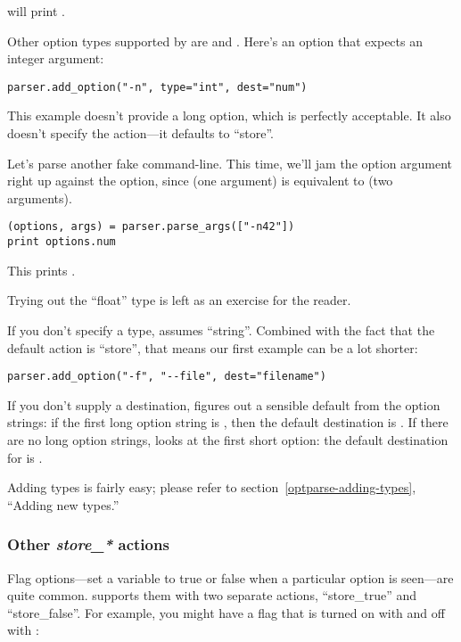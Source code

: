 will print .

Other option types supported by  are  and
.  Here's an option that expects an integer argument:

\begin{verbatim}
parser.add_option("-n", type="int", dest="num")
\end{verbatim}

This example doesn't provide a long option, which is perfectly
acceptable.  It also doesn't specify the action---it defaults to
``store''.
  
Let's parse another fake command-line.  This time, we'll jam the option
argument right up against the option, since  (one
argument) is equivalent to  (two arguments).

\begin{verbatim}
(options, args) = parser.parse_args(["-n42"])
print options.num
\end{verbatim}

This prints .

Trying out the ``float'' type is left as an exercise for the reader.

If you don't specify a type,  assumes ``string''.
Combined with the fact that the default action is ``store'', that
means our first example can be a lot shorter:

\begin{verbatim}
parser.add_option("-f", "--file", dest="filename")
\end{verbatim}

If you don't supply a destination,  figures out a
sensible default from the option strings: if the first long option
string is , then the default destination is
.  If there are no long option strings,
 looks at the first short option: the default
destination for  is .

Adding types is fairly easy; please refer to
section~\ref{optparse-adding-types}, ``Adding new types.''

\subsubsection{Other \emph{store_*} actions%
               \label{optparse-other-store-actions}}

Flag options---set a variable to true or false when a particular
option is seen---are quite common.   supports them
with two separate actions, ``store_true'' and ``store_false''.  For
example, you might have a  flag that is turned on with
 and off with :

